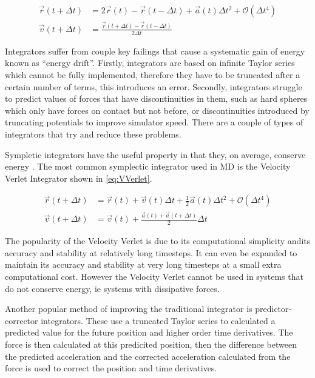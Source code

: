 \message{ !name(main.tex)}\documentclass[12pt]{UoAthesis}
\begin{document}
\begin{subequations} 
  \begin{align} 
    \vec{r}(t + \Delta t) &= 2\vec{r}(t) - \vec{r}(t - \Delta t) 
    + \vec{a}(t)\Delta t^2 + \mathcal{O}(\Delta t^4)
    \label{eq:Verletpos} \\
    \vec{v}(t+\Delta t) &= \frac{\vec{r}(t+\Delta t) -
      \vec{r}(t-\Delta t)}{2\Delta t} 
    \label{eq:VerletVel} 
  \end{align}
\end{subequations}

Integrators suffer from couple key failings that cause a systematic
gain of energy known as ``energy drift''. Firstly, integrators are
based on infinite Taylor series which cannot be fully implemented,
therefore they have to be truncated after a certain number of terms,
this introduces an error. Secondly, integrators struggle to predict
values of forces that have discontinuities in them, such as hard
spheres which only have forces on contact but not before, or
discontinuities introduced by truncating potentials to improve
simulator speed.  There are a couple of types of integrators that try
and reduce these problems.

Sympletic integrators have the useful property in that they, on
average, conserve energy \cite{Hairer2003}. The most common symplectic
integrator used in MD is the Velocity Verlet Integrator
\cite{Swope1982} shown in \eqref{eq:VVerlet}.

\begin{subequations}
\label{eq:VVerlet}
\begin{align}
 \vec{r}(t + \Delta t) &= \vec{r}(t) + \vec{v}(t) \Delta t 
 + \frac{1}{2}\vec{a}(t) \Delta t^2 + \mathcal{O}(\Delta t^4)
 \label{eq:VVerletpos} \\
 \vec{v}(t+\Delta t) &= \vec{v}(t) + \frac{\vec{a}(t) 
   + \vec{a}(t+\Delta t)}{2}\Delta t
 \label{eq:VVerletVel}
\end{align}
\end{subequations}

The popularity of the Velocity Verlet is due to its computational
simplicity andits accuracy and stability at relatively long
timesteps. It can even be expanded\cite{Khakimov2002} to maintain its
accuracy and stability at very long timesteps at a small extra
computational cost. However the Velocity Verlet cannot be used in
systems that do not conserve energy, ie systems with dissipative
forces.

Another popular method of improving the traditional integrator is
predictor-corrector integrators. These use a truncated Taylor series
to calculated a predicted value for the future position and higher
order time derivatives. The force is then calculated at this
predicited position, then the difference between the predicted
acceleration and the corrected acceleration calculated from the force
is used to correct the position and time derivatives.
\end{document}
